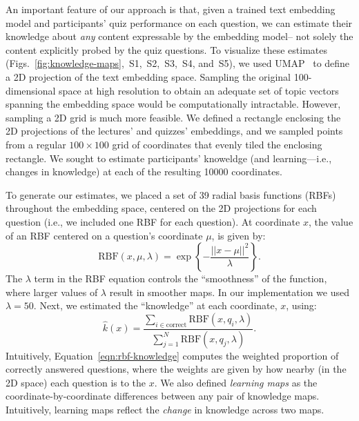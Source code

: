 \documentclass[10pt]{article}
\newcommand{\individualKnowledgeMapsA}{S1}
\newcommand{\individualKnowledgeMapsB}{S2}
\newcommand{\individualKnowledgeMapsC}{S3}
\newcommand{\individualLearningMapsA}{S4}
\newcommand{\individualLearningMapsB}{S5}
\begin{document}
An important feature of our approach is that, given a trained text embedding
model and participants' quiz performance on each question, we can estimate
their knowledge about \textit{any} content expressable by the embedding model--
not solely the content explicitly probed by the quiz questions. To visualize
these estimates
(Figs.~\ref{fig:knowledge-maps},~\individualKnowledgeMapsA,~\individualKnowledgeMapsB,~\individualKnowledgeMapsC,~\individualLearningMapsA,
and~\individualLearningMapsB), we used UMAP~\citep{McInEtal18a} to define a 2D
projection of the text embedding space. Sampling the original 100-dimensional
space at high resolution to obtain an adequate set of topic vectors spanning
the embedding space would be computationally intractable. However, sampling a
2D grid is much more feasible. We defined a rectangle enclosing the 2D
projections of the lectures' and quizzes' embeddings, and we sampled points
from a regular $100 \times 100$ grid of coordinates that evenly tiled the
enclosing rectangle. We sought to estimate participants' knoweldge (and
learning---i.e., changes in knowledge) at each of the resulting 10000
coordinates.

To generate our estimates, we placed a set of 39 radial basis functions (RBFs)
throughout the embedding space, centered on the 2D projections for each
question (i.e., we included one RBF for each question). At coordinate $x$, the
value of an RBF centered on a question's coordinate $\mu$, is given by:
\begin{equation}
    \mathrm{RBF}(x, \mu, \lambda) = \exp\left\{-\frac{||x - \mu||^2}{\lambda}\right\}.
    \label{eqn:rbf}
\end{equation}
The $\lambda$ term in the RBF equation controls the ``smoothness'' of the
function, where larger values of $\lambda$ result in smoother maps. In our
implementation we used $\lambda = 50$.  Next, we estimated the ``knowledge''
at each coordinate, $x$, using:
\begin{equation}
    \hat{k}(x) = \frac{\sum_{i \in \mathrm{correct}} \mathrm{RBF}(x, q_i, \lambda)}{\sum_{j = 1}^N \mathrm{RBF}(x, q_j, \lambda)}.
    \label{eqn:rbf-knowledge}
\end{equation}
Intuitively, Equation~\ref{eqn:rbf-knowledge} computes the weighted proportion of
correctly answered questions, where the weights are given by how nearby (in the 2D space)
each question is to the $x$.  We also defined \textit{learning maps} as the coordinate-by-coordinate
differences between any pair of knowledge maps.  Intuitively, learning maps reflect the \textit{change}
in knowledge across two maps.




\end{document}
